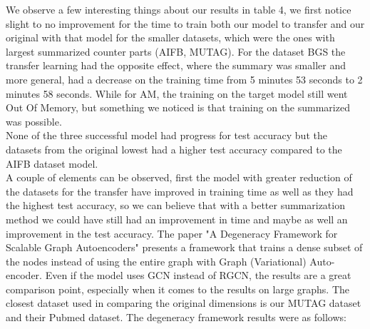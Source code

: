 \documentclass[11pt]{article}
\begin{document}
We observe a few interesting things about our results in table 4, we first notice slight to no improvement for the time to train both our model to transfer and our original with that model for the smaller datasets, which were the ones with largest summarized counter parts (AIFB, MUTAG). For the dataset BGS the transfer learning had the opposite effect, where the summary was smaller and more general, had a decrease on the training time from 5 minutes 53 seconds to 2 minutes 58 seconds. While for AM, the training on the target model still went Out Of Memory, but something we noticed is that training on the summarized was possible.\\
None of the three successful model had progress for test accuracy but the datasets from the original lowest had a higher test accuracy compared to the AIFB dataset model.\\
A couple of elements can be observed, first the model with greater reduction of the datasets for the transfer have improved in training time as well as they had the highest test accuracy, so we can believe that with a better summarization method we could have still had an improvement in time and maybe as well an improvement in the test accuracy. The paper "A Degeneracy Framework for Scalable Graph Autoencoders" \cite{salha2019degeneracy} presents a framework that trains a dense subset of the nodes instead of using the entire graph with Graph (Variational) Auto-encoder. Even if the model uses GCN instead of RGCN, the results are a great comparison point, especially when it comes to the results on large graphs. The closest dataset used in comparing the original dimensions is our MUTAG dataset and their Pubmed dataset. The degeneracy framework results were as follows:
\\
\end{document}
